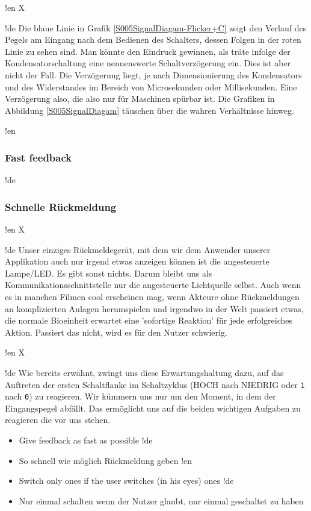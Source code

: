 !en X

!de Die blaue Linie in Grafik \ref{S005SignalDiagam-Flicker+C} zeigt den Verlauf des Pegels am Eingang nach dem Bedienen des Schalters, dessen Folgen in der roten Linie zu sehen sind. Man könnte den Eindruck gewinnen, als träte infolge der Kondensatorschaltung eine nennenswerte Schaltverzögerung ein. Dies ist aber nicht der Fall. Die Verzögerung liegt, je nach Dimensionierung des Kondensators und des Widerstandes im Bereich von Microsekunden oder Millisekunden. Eine Verzögerung also, die also nur für Maschinen spürbar ist. Die Grafiken in Abbildung \ref{S005SignalDiagam} täuschen über die wahren Verhältnisse hinweg.



!en \subsubsection{Fast feedback}
!de \subsubsection{Schnelle Rückmeldung}



!en X

!de Unser einziges Rückmeldegerät, mit dem wir dem Anwender unserer Applikation auch nur irgend etwas anzeigen können ist die angesteuerte Lampe/LED. Es gibt sonst nichts. Darum bleibt uns als Kommunikationsschnittstelle nur die angesteuerte Lichtquelle selbst. Auch wenn es in manchen Filmen cool erscheinen mag, wenn Akteure ohne Rückmeldungen an komplizierten Anlagen herumspielen und irgendwo in der Welt passiert etwas, die normale Bioeinheit erwartet eine 'sofortige Reaktion' für jede erfolgreiches Aktion. Passiert das nicht, wird es für den Nutzer schwierig.



!en X

!de Wie bereits erwähnt, zwingt uns diese Erwartungshaltung dazu, auf das Auftreten der ersten Schaltflanke im Schaltzyklus (HOCH nach NIEDRIG oder \texttt{1} nach \texttt{0}) zu reagieren. Wir kümmern uns nur um den Moment, in dem der Eingangspegel abfällt. Das ermöglicht uns auf die beiden wichtigen Aufgaben zu reagieren die vor uns stehen.

\begin{itemize}
!en   \item Give feedback as fast as possible
!de   \item So schnell wie möglich Rückmeldung geben
!en   \item Switch only ones if the user switches (in his eyes) ones
!de   \item Nur einmal schalten wenn der Nutzer glaubt, nur einmal geschaltet zu haben
\end{itemize}



